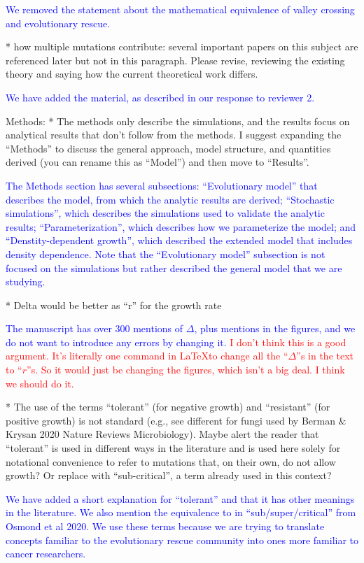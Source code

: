 \documentclass[12pt]{extarticle}
\begin{document}
\textcolor{blue}{We removed the statement about the mathematical equivalence of valley crossing and evolutionary rescue.}

* how multiple mutations contribute: several important papers on this subject are referenced later but not in this paragraph. Please revise, reviewing the existing theory and saying how the current theoretical work differs.

\textcolor{blue}{We have added the material, as described in our response to reviewer 2.}

Methods:
* The methods only describe the simulations, and the results focus on analytical results that don't follow from the methods. I suggest expanding the ``Methods'' to discuss the general approach, model structure, and quantities derived (you can rename this as ``Model'') and then move to ``Results''.

\textcolor{blue}{
The Methods section has several subsections: ``Evolutionary model'' that describes the model, from which the analytic results are derived; ``Stochastic simulations'', which describes the simulations used to validate the analytic results; ``Parameterization'', which describes how we parameterize the model; and ``Denstity-dependent growth'', which described the extended model that includes density dependence. Note that the ``Evolutionary model'' subsection is not focused on the simulations but rather described the general model that we are studying.} 

* Delta would be better as ``r'' for the growth rate

\textcolor{blue}{The manuscript has over 300 mentions of $\Delta$, plus mentions in the figures, and we do not want to introduce any errors by changing it.}
\textcolor{red}{I don't think this is a good argument. It's literally one command in \LaTeX to change all the ``$\Delta$''s in the text to ``$r$''s. So it would just be changing the figures, which isn't a big deal. I think we should do it.}

* The use of the terms ``tolerant'' (for negative growth) and ``resistant'' (for positive growth) is not standard (e.g., see different for fungi used by Berman $\&$ Krysan 2020 Nature Reviews Microbiology). Maybe alert the reader that ``tolerant'' is used in different ways in the literature and is used here solely for notational convenience to refer to mutations that, on their own, do not allow growth? Or replace with ``sub-critical'', a term already used in this context?

\textcolor{blue}{We have added a short explanation for ``tolerant'' and that it has other meanings in the literature. We also mention the equivalence to in ``sub/super/critical'' from Osmond et al 2020.
We use these terms because we are trying to translate concepts familiar to the evolutionary rescue community into ones more familiar to cancer researchers.} %
\end{document}
